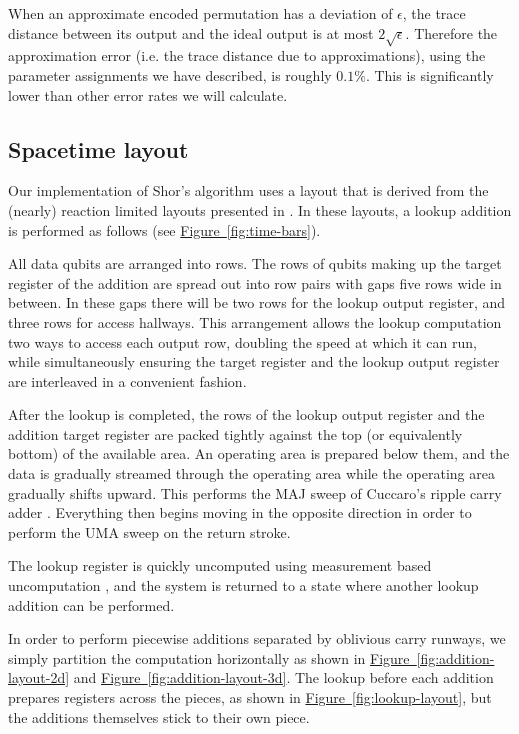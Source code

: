 \documentclass[superscriptaddress,notitlepage,longbibliography]{revtex4-1}
\theoremstyle{definition}
\theoremstyle{definition}
\newcommand{\fig}[1]{\hyperref[fig:#1]{Figure~\ref*{fig:#1}}}
\begin{document}
When an approximate encoded permutation has a deviation of $\epsilon$, the trace distance between its output and the ideal output is at most $2 \sqrt{\epsilon}$.
Therefore the approximation error (i.e. the trace distance due to approximations), using the parameter assignments we have described, is roughly $0.1\%$.
This is significantly lower than other error rates we will calculate.


\subsection{Spacetime layout}

Our implementation of Shor's algorithm uses a layout that is derived from the (nearly) reaction limited layouts presented in \cite{gidney2019autoccz}.
In these layouts, a lookup addition is performed as follows (see \fig{time-bars}).

All data qubits are arranged into rows.
The rows of qubits making up the target register of the addition are spread out into row pairs with gaps five rows wide in between.
In these gaps there will be two rows for the lookup output register, and three rows for access hallways.
This arrangement allows the lookup computation two ways to access each output row, doubling the speed at which it can run, while simultaneously ensuring the target register and the lookup output register are interleaved in a convenient fashion.

After the lookup is completed, the rows of the lookup output register and the addition target register are packed tightly against the top (or equivalently bottom) of the available area.
An operating area is prepared below them, and the data is gradually streamed through the operating area while the operating area gradually shifts upward.
This performs the MAJ sweep of Cuccaro's ripple carry adder \cite{cuccaro2004adder}.
Everything then begins moving in the opposite direction in order to perform the UMA sweep on the return stroke.

The lookup register is quickly uncomputed using measurement based uncomputation \cite{berry2019qubitization}, and the system is returned to a state where another lookup addition can be performed.

In order to perform piecewise additions separated by oblivious carry runways, we simply partition the computation horizontally as shown in \fig{addition-layout-2d} and \fig{addition-layout-3d}.
The lookup before each addition prepares registers across the pieces, as shown in \fig{lookup-layout}, but the additions themselves stick to their own piece.
\end{document}

